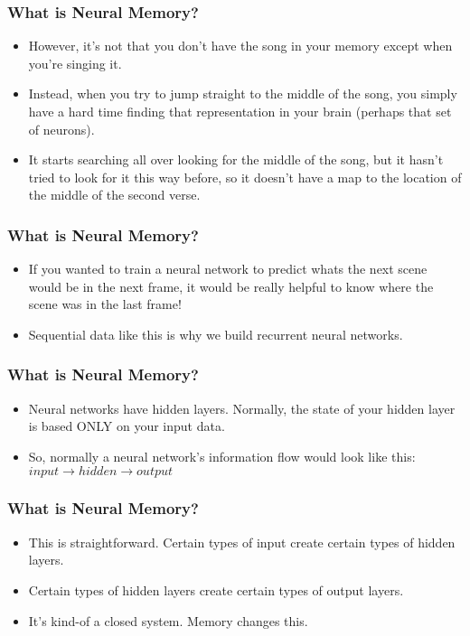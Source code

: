 \begin{frame}[fragile] \frametitle{What is Neural Memory?}

\begin{itemize}
\item However, it's not that you don't have the song in your memory except when you're singing it. 
\item Instead, when you try to jump straight to the middle of the song, you simply have a hard time finding that representation in your brain (perhaps that set of neurons).
\item It starts searching all over looking for the middle of the song, but it hasn't tried to look for it this way before, so it doesn't have a map to the location of the middle of the second verse.
\end{itemize}
\end{frame}

\begin{frame}[fragile] \frametitle{What is Neural Memory?}

\begin{itemize}
\item If you wanted to train a neural network to predict whats the next scene would be in the next frame, it would be really helpful to know where the scene was in the last frame! 
\item Sequential data like this is why we build recurrent neural networks.
\end{itemize}
\end{frame}

\begin{frame}[fragile] \frametitle{What is Neural Memory?}

\begin{itemize}
\item Neural networks have hidden layers. Normally, the state of your hidden layer is based ONLY on your input data. 
\item So, normally a neural network's information flow would look like this:
$input \rightarrow hidden  \rightarrow  output$
\end{itemize}
\end{frame}


\begin{frame}[fragile] \frametitle{What is Neural Memory?}

\begin{itemize}
\item This is straightforward. Certain types of input create certain types of hidden layers. 
\item Certain types of hidden layers create certain types of output layers. 
\item It's kind-of a closed system. Memory changes this. 
\end{itemize}
\end{frame}


